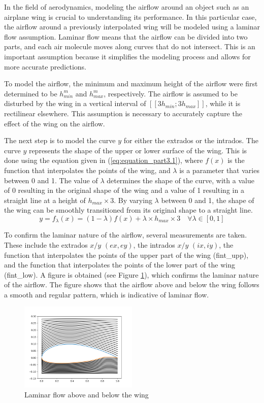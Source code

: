 In the field of aerodynamics, modeling the airflow around an object such as an airplane wing is crucial to understanding its performance. In this particular case, the airflow around a previously interpolated wing will be modeled using a laminar flow assumption. Laminar flow means that the airflow can be divided into two parts, and each air molecule moves along curves that do not intersect. This is an important assumption because it simplifies the modeling process and allows for more accurate predictions.

To model the airflow, the minimum and maximum height of the airflow were first determined to be $h_{min}^{m}$ and $h_{max}^{m}$, respectively. The airflow is assumed to be disturbed by the wing in a vertical interval of $[[3h_{min}; 3h_{max}]]$, while it is rectilinear elsewhere. This assumption is necessary to accurately capture the effect of the wing on the airflow.

The next step is to model the curve $y$ for either the extrados or the intrados. The curve $y$ represents the shape of the upper or lower surface of the wing. This is done using the equation given in (\ref{eq:equation_part3.1}), where $f(x)$ is the function that interpolates the points of the wing, and $\lambda$ is a parameter that varies between 0 and 1. The value of $\lambda$ determines the shape of the curve, with a value of 0 resulting in the original shape of the wing and a value of 1 resulting in a straight line at a height of $h_{max}\times 3$. By varying $\lambda$ between 0 and 1, the shape of the wing can be smoothly transitioned from its original shape to a straight line.
\begin{equation}
  \label{eq:equation_part3.1}
  y = f_{\lambda}(x) = (1 - \lambda)f(x) + \lambda \times h_{max} \times 3 \quad \forall \lambda \in [0,1] 
\end{equation}

To confirm the laminar nature of the airflow, several measurements are taken. These include the extrados $x/y$ $(ex, ey)$, the intrados $x/y$ $(ix, iy)$, the function that interpolates the points of the upper part of the wing (fint\_upp), and the function that interpolates the points of the lower part of the wing (fint\_low). A figure is obtained (see Figure \ref{fig:laminar}), which confirms the laminar nature of the airflow. The figure shows that the airflow above and below the wing follows a smooth and regular pattern, which is indicative of laminar flow.
\begin{figure}[H]
  \centering
  \includegraphics[width=0.5\textwidth]{img/laminar_flow.png}
  \caption{Laminar flow above and below the wing}
  \label{fig:laminar}
\end{figure}

